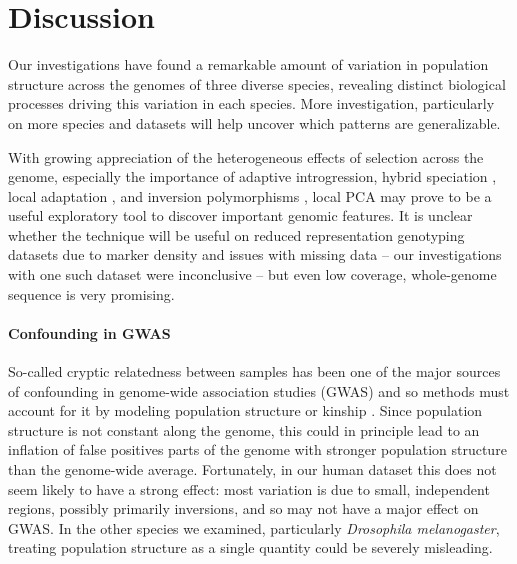\documentclass[11pt, oneside]{article}   	%
\begin{document}
\section{Discussion}

Our investigations have found a remarkable amount of variation in population structure across the genomes
of three diverse species,
revealing distinct biological processes driving this variation in each species.
More investigation, particularly on more species and datasets will help uncover which patterns are generalizable.

With growing appreciation of the heterogeneous effects of selection across the genome,
especially the importance of adaptive introgression, hybrid speciation \citep{pool2015natural,brandvain2014speciation,hufford2013genomic,fitzpatrick2010rapid,staubach2012genome},
local adaptation \citep{lenormand2002limits,wang2014isolation},
and inversion polymorphisms \citep{kirkpatrick2015chromosome,kirkpatrick2010chromosome},
local PCA may prove to be a useful exploratory tool to discover important genomic features.
It is unclear whether the technique will be useful on reduced representation genotyping datasets 
due to marker density and issues with missing data --
our investigations with one such dataset were inconclusive --
but even low coverage, whole-genome sequence is very promising.


\paragraph{Confounding in GWAS}
So-called cryptic relatedness between samples
has been one of the major sources of confounding in genome-wide association studies (GWAS)
and so methods must account for it by modeling population structure or kinship \citep{gwas_confounding_review,mixed_models}.
Since population structure is not constant along the genome,
this could in principle lead to an inflation of false positives parts of the genome
with stronger population structure than the genome-wide average.
Fortunately, in our human dataset this does not seem likely to have a strong effect:
most variation is due to small, independent regions, possibly primarily inversions,
and so may not have a major effect on GWAS.
In the other species we examined, particularly \textit{Drosophila melanogaster},
treating population structure as a single quantity could be severely misleading.
\end{document}
